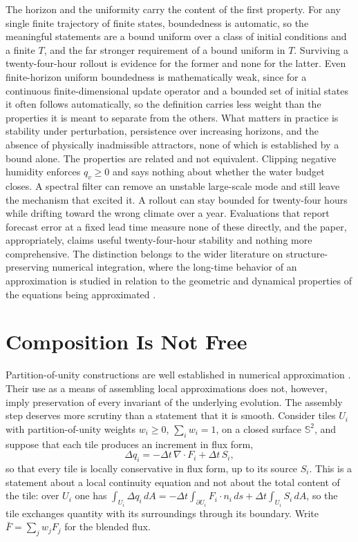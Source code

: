 \documentclass[11pt]{article}
\theoremstyle{definition}
\theoremstyle{remark}
\begin{document}
The horizon and the uniformity carry the content of the first property. For any single finite trajectory of finite states, boundedness is automatic, so the meaningful statements are a bound uniform over a class of initial conditions and a finite $T$, and the far stronger requirement of a bound uniform in $T$. Surviving a twenty-four-hour rollout is evidence for the former and none for the latter. Even finite-horizon uniform boundedness is mathematically weak, since for a continuous finite-dimensional update operator and a bounded set of initial states it often follows automatically, so the definition carries less weight than the properties it is meant to separate from the others. What matters in practice is stability under perturbation, persistence over increasing horizons, and the absence of physically inadmissible attractors, none of which is established by a bound alone. The properties are related and not equivalent. Clipping negative humidity enforces $q_v \ge 0$ and says nothing about whether the water budget closes. A spectral filter can remove an unstable large-scale mode and still leave the mechanism that excited it. A rollout can stay bounded for twenty-four hours while drifting toward the wrong climate over a year. Evaluations that report forecast error at a fixed lead time measure none of these directly, and the paper, appropriately, claims useful twenty-four-hour stability and nothing more comprehensive. The distinction belongs to the wider literature on structure-preserving numerical integration, where the long-time behavior of an approximation is studied in relation to the geometric and dynamical properties of the equations being approximated \cite{hairer2006geometric}.

\section{Composition Is Not Free}

Partition-of-unity constructions are well established in numerical approximation \cite{babuska1997partition}. Their use as a means of assembling local approximations does not, however, imply preservation of every invariant of the underlying evolution. The assembly step deserves more scrutiny than a statement that it is smooth. Consider tiles $U_i$ with partition-of-unity weights $w_i \ge 0$, $\sum_i w_i = 1$, on a closed surface $\mathbb S^2$, and suppose that each tile produces an increment in flux form,
\begin{equation}
\Delta q_i = -\Delta t\,\nabla\!\cdot F_i + \Delta t\, S_i,
\end{equation}
so that every tile is locally conservative in flux form, up to its source $S_i$. This is a statement about a local continuity equation and not about the total content of the tile: over $U_i$ one has $\int_{U_i}\Delta q_i\,dA = -\Delta t\int_{\partial U_i}F_i\cdot n_i\,ds + \Delta t\int_{U_i}S_i\,dA$, so the tile exchanges quantity with its surroundings through its boundary. Write $\bar F = \sum_j w_j F_j$ for the blended flux.
\end{document}
